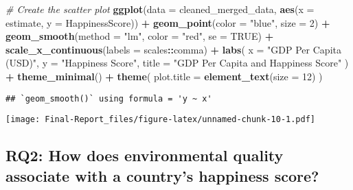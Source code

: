 \documentclass[
]{article}
\newenvironment{Shaded}{\begin{snugshade}}{\end{snugshade}}
\newcommand{\AttributeTok}[1]{\textcolor[rgb]{0.13,0.29,0.53}{#1}}
\newcommand{\CommentTok}[1]{\textcolor[rgb]{0.56,0.35,0.01}{\textit{#1}}}
\newcommand{\ConstantTok}[1]{\textcolor[rgb]{0.56,0.35,0.01}{#1}}
\newcommand{\DecValTok}[1]{\textcolor[rgb]{0.00,0.00,0.81}{#1}}
\newcommand{\FunctionTok}[1]{\textcolor[rgb]{0.13,0.29,0.53}{\textbf{#1}}}
\newcommand{\NormalTok}[1]{#1}
\newcommand{\SpecialCharTok}[1]{\textcolor[rgb]{0.81,0.36,0.00}{\textbf{#1}}}
\newcommand{\StringTok}[1]{\textcolor[rgb]{0.31,0.60,0.02}{#1}}
\begin{document}
\begin{Shaded}
\begin{Highlighting}[]
\CommentTok{\# Create the scatter plot}
\FunctionTok{ggplot}\NormalTok{(}\AttributeTok{data =}\NormalTok{ cleaned\_merged\_data, }\FunctionTok{aes}\NormalTok{(}\AttributeTok{x =}\NormalTok{ estimate, }\AttributeTok{y =}\NormalTok{ HappinessScore)) }\SpecialCharTok{+}
    \FunctionTok{geom\_point}\NormalTok{(}\AttributeTok{color =} \StringTok{"blue"}\NormalTok{, }\AttributeTok{size =} \DecValTok{2}\NormalTok{) }\SpecialCharTok{+}                
    \FunctionTok{geom\_smooth}\NormalTok{(}\AttributeTok{method =} \StringTok{"lm"}\NormalTok{, }\AttributeTok{color =} \StringTok{"red"}\NormalTok{, }\AttributeTok{se =} \ConstantTok{TRUE}\NormalTok{) }\SpecialCharTok{+} 
    \FunctionTok{scale\_x\_continuous}\NormalTok{(}\AttributeTok{labels =}\NormalTok{ scales}\SpecialCharTok{::}\NormalTok{comma) }\SpecialCharTok{+}          
    \FunctionTok{labs}\NormalTok{(}
        \AttributeTok{x =} \StringTok{"GDP Per Capita (USD)"}\NormalTok{,}
        \AttributeTok{y =} \StringTok{"Happiness Score"}\NormalTok{,}
        \AttributeTok{title =} \StringTok{"GDP Per Capita and Happiness Score"}
\NormalTok{    ) }\SpecialCharTok{+}
  \FunctionTok{theme\_minimal}\NormalTok{() }\SpecialCharTok{+} 
  \FunctionTok{theme}\NormalTok{(}
    \AttributeTok{plot.title =} \FunctionTok{element\_text}\NormalTok{(}\AttributeTok{size =} \DecValTok{12}\NormalTok{) }
\NormalTok{  )}
\end{Highlighting}
\end{Shaded}

\begin{verbatim}
## `geom_smooth()` using formula = 'y ~ x'
\end{verbatim}

\texttt{[image: Final-Report\_files/figure-latex/unnamed-chunk-10-1.pdf]}

\subsection{RQ2: How does environmental quality associate with a
country's happiness
score?}\label{rq2-how-does-environmental-quality-associate-with-a-countrys-happiness-score}
\end{document}
